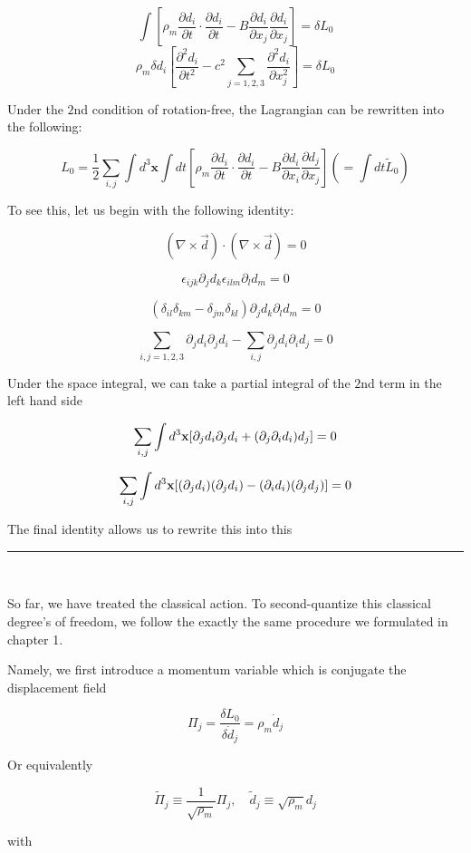 ﻿\documentclass[twoside]{book}
\numberwithin{equation}{section}
\begin{document}
\[\int \left[\rho_m\frac{\partial d_i}{\partial t}\cdot\frac{\partial d_i}{\partial t} - B\frac{\partial d_i}{\partial x_j}\frac{\partial d_i}{\partial x_j}\right] = \delta L_0\]
\[\rho_m\delta d_i\left[\frac{\partial^2 d_i}{\partial t^2} - c^2\sum_{j = 1,2,3}\frac{\partial^2 d_i}{\partial x_j^2}\right] = \delta L_0 \]

Under the $2$nd condition of rotation-free, the Lagrangian can be rewritten into the following:

\[L_0 = \frac{1}{2}\sum_{i,j}\int d^3\bm{x}\int dt \left[\rho_m\frac{\partial d_i}{\partial t}\cdot\frac{\partial d_i}{\partial t} - B\frac{\partial d_i}{\partial x_i}\frac{\partial d_j}{\partial x_j}\right] (=\int dt \tilde{L}_0) \]

To see this, let us begin with the following identity:

\[(\nabla\times\vec{d})\cdot(\nabla\times\vec{d}) = 0 \]

\[\epsilon_{ijk}\partial_j d_k\epsilon_{ilm}\partial_l d_m = 0 \]

\[(\delta_{il}\delta_{km} - \delta_{jm}\delta_{kl})\partial_j d_k\partial_l d_m = 0 \]

\[\sum_{i,j = 1,2,3} \partial_j d_i \partial_j d_i - \sum_{i,j}\partial_j d_i \partial_i d_j = 0 \]

Under the space integral, we can take a partial integral of the $2$nd term in the left hand side

\[\sum_{i,j}\int d^3{\bf x}[\partial_j d_i\partial_j d_i+(\partial_j\partial_i d_i)d_j] = 0 \]

\[\sum_{i,j}\int d^3{\bf x}[(\partial_j d_i)(\partial_j d_i) - (\partial_i d_i)(\partial_j d_j)] = 0 \]

The final identity allows us to rewrite this into this

\hrule

\ 

So far, we have treated the classical action. To second-quantize this classical degree's of freedom, we follow the exactly the same procedure we formulated in chapter 1. 

Namely, we first introduce a momentum variable which is conjugate the displacement field

\[\Pi_j = \frac{\delta L_0}{\delta \dot{d}_j} = \rho_m\dot{d}_j \]

Or equivalently 

\[\tilde{\Pi}_j\equiv\frac{1}{\sqrt{\rho_m}}\Pi_j,\quad \tilde{d}_j\equiv\sqrt{\rho_m}d_j \]

with 
\end{document}
